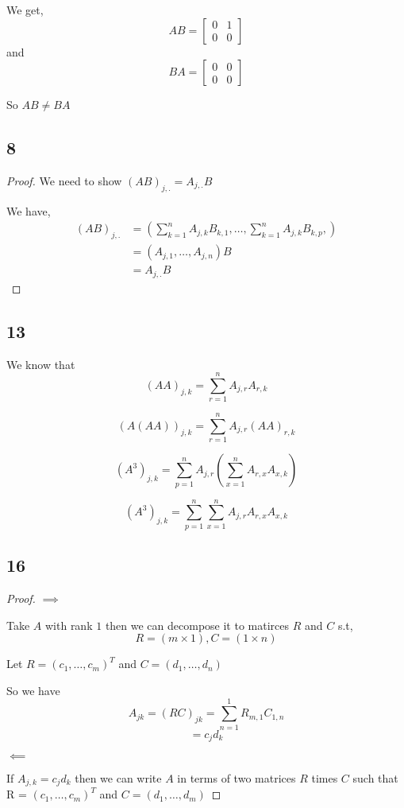 \documentclass[a4paper]{report}
\begin{document}
We get, 
$$ AB = \begin{bmatrix}
    0&1\\
0&0\end{bmatrix}$$
and 
$$ BA = \begin{bmatrix}
    0&0\\
0&0\end{bmatrix}$$ 


So $AB \ne BA$
\subsection*{8}

\begin{proof}
    We need to show $(AB)_{j,.} = A_{j,.}B$

    We have, 
    \begin{align*}
        (AB)_{j,.}  &= (\sum_{k=1}^n A_{j,k} B_{k,1}, \dots, \sum_{k=1}^n A_{j,k} B_{k,p}, )\\
                    &= (A_{j,1},\dots,A_{j,n})B\\
                    &= A_{j,.}B
    \end{align*}

\end{proof}


\subsection*{13}
We know that 
$$ (AA)_{j,k} = \sum_{r = 1}^n A_{j,r} A_{r,k} $$ 

$$ (A(AA))_{j,k} = \sum_{r = 1}^n A_{j,r} (AA)_{r,k}$$ 

$$ (A^{3})_{j,k} = \sum_{p = 1}^n A_{j,r}( \sum_{x = 1}^n A_{r,x} A_{x,k}  )$$ 

$$ (A^{3})_{j,k} = \sum_{p = 1}^n \sum_{x = 1}^n A_{j,r} A_{r,x} A_{x,k}$$ 






\subsection*{16}
\begin{proof}
    

$\implies$ 

Take $A$ with rank $1$ then we can decompose it to matirces $R$ and $C$ s.t, 
$$ R = (m \times  1), C = (1 \times  n) $$ 

Let $R = (c_1,\dots,c_m)^T$ and $C = (d_1,\dots,d_n)$

So we have $$A_{jk} = (RC)_{jk} = \sum_{n = 1}^1 R_{m,1}C_{1,n}$$
$$ = c_jd_k $$ 

$\impliedby$

If $A_{j,k} = c_jd_k$ then we can write  $A$ in terms of two matrices $R$  times $C$ such that R = $(c_1,\dots,c_m)^T$ and $C = (d_1,\dots,d_m)$

\end{proof}
\end{document}
